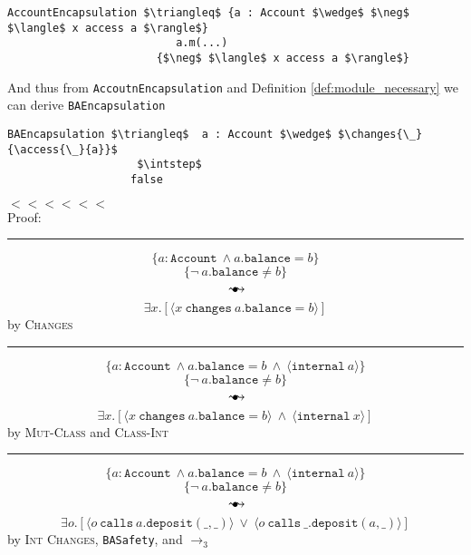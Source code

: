 \documentclass[12pt]{article}
\newcommand\trans{\mathlarger{\mathlarger \leadsto}}
\newcommand\intstep{\hspace{1.5mm}{\raisebox{3pt}{$\bullet$}}\hspace{-1.5mm}{\hookrightarrow}}
\newcommand\ot{\hspace{2mm}{\raisebox{1pt}{$\bullet$}}\hspace{-3mm}{\trans}}
\newcommand\mut[3]{\langle #1\ \texttt{mut}\ #2.#3 \rangle}
\newcommand\changes[2]{\langle #1\ \texttt{changes}\ #2 \rangle}
\newcommand\access[2]{\langle #1\ \texttt{access}\ #2 \rangle}
\numberwithin{case}{lemma}
\numberwithin{case}{theorem}
\numberwithin{subcase}{case}
\begin{document}
\begin{lstlisting}[mathescape=true]
AccountEncapsulation $\triangleq$ {a : Account $\wedge$ $\neg$ $\langle$ x access a $\rangle$}
				          a.m(...)
				       {$\neg$ $\langle$ x access a $\rangle$}
\end{lstlisting}
And thus from \texttt{AccoutnEncapsulation} and Definition \ref{def:module_necessary} we can derive \texttt{BAEncapsulation}
\begin{lstlisting}[mathescape=true]
BAEncapsulation $\triangleq$  a : Account $\wedge$ $\changes{\_}{\access{\_}{a}}$
                    $\intstep$
                   false
\end{lstlisting}
{\color{Green} $<<<<<<$}\\
Proof:
\vspace{3mm}
\footnotesize
\hrule
\vspace{3mm}
$$
	\{a : \texttt{Account}\ \wedge a.\texttt{balance} = b\}
$$
$$
	\{\neg\ a.\texttt{balance} \neq b\}
$$
$$\ot$$
$$
	\exists x.[\changes{x}{a.\texttt{balance} = b}]
$$
\hfill by \textsc{Changes}
\hrule
\vspace{3mm}
$$
	\{a : \texttt{Account}\ \wedge a.\texttt{balance} = b\ \wedge\  \langle \texttt{internal}\ a \rangle\}
$$
$$
	\{\neg\ a.\texttt{balance} \neq b\}
$$
$$\ot$$
$$
	{\exists x.[\changes{x}{a.\texttt{balance} = b}\ \wedge\ \langle \texttt{internal}\ x \rangle]}
$$
\hfill by \textsc{Mut-Class} and \textsc{Class-Int}
\hrule
\vspace{3mm}
$$
	\{a : \texttt{Account}\ \wedge a.\texttt{balance} = b\ \wedge\  \langle \texttt{internal}\ a \rangle\}
$$
$$
	\{\neg\ a.\texttt{balance} \neq b\}
$$
$$\ot$$
$$
	{\exists o.[\langle o\ \texttt{calls}\ a.\texttt{deposit}(\_, \_) \rangle\ \vee\ \langle o\ \texttt{calls}\ \_.\texttt{deposit}(a, \_) \rangle]}
$$
\hfill by \textsc{Int Changes}, \texttt{BASafety}, and $\longrightarrow_3$ \\
\end{document}

